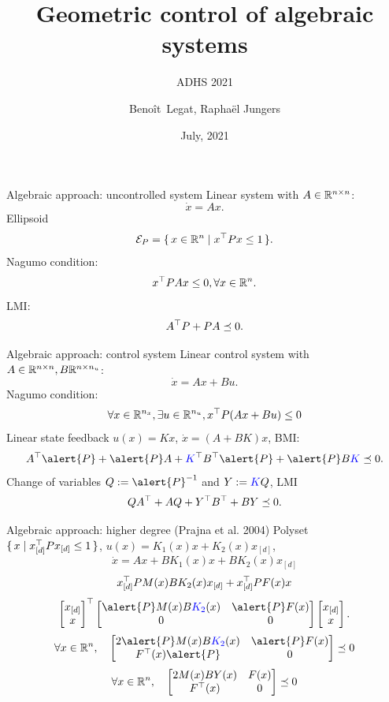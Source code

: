 \documentclass{beamer}
\title{Geometric control of algebraic systems}
\subtitle{ADHS 2021}
\date{July, 2021}
\author{Beno\^it~Legat, Rapha\"el Jungers}
\newcommand{\xd}{x_{[d]}}
\newcommand{\xdt}{x_{[d]}^\Tr}
\begin{document}
  \maketitle


\begin{frame}{Algebraic approach: uncontrolled system}
  Linear system with $A \in \mathbb{R}^{n \times n}$:
  \[\dot{x} = Ax.\]
  Ellipsoid
  $$\mathcal{E}_P = \{\, x \in \mathbb{R}^n \mid x^\top P x \leq 1 \,\}.$$
  Nagumo condition:
  $$x^\top PAx \leq 0, \forall x \in \mathbb{R}^n.$$
  LMI:
  $$A^\top P + PA \preceq 0.$$
\end{frame}

\begin{frame}{Algebraic approach: control system}
  Linear control system with $A \in \mathbb{R}^{n \times n}, B \mathbb{R}^{n \times n_u}$:
  \[\dot{x} = Ax + Bu.\]
  Nagumo condition:
  $$\forall x \in \mathbb{R}^{n_x}, \exists u \in \mathbb{R}^{n_u}, x^\top P(Ax + Bu) \leq 0$$
  Linear state feedback $u(x) = Kx$, $\dot{x} = (A + BK) x$, BMI:
  \[ A^\Tr \alert{P} + \alert{P}A + \textcolor{blue}{K}^\Tr B^\Tr \alert{P} + \alert{P}B\textcolor{blue}{K} \preceq 0. \]
  Change of variables $Q := \alert{P}^{-1}$ and $Y := \textcolor{blue}{K}Q$, LMI
  $$QA^\top + AQ + Y^\top B^\top + BY \preceq 0.$$
\end{frame}

\begin{frame}{Algebraic approach: higher degree (Prajna et al. 2004)}
  Polyset $\setbuild{x}{\xdt P \xd \le 1}$,
  $u(x) = K_1(x)x + K_2(x)\xd$,
  $$\dot{x} = Ax + BK_1(x)x + BK_2(x)\xd$$
  $$\xdt P M(x) B K_2(x) \xd + \xdt PF(x) x$$
$$
  \begin{bmatrix}
    \xd\\
    x
  \end{bmatrix}^\Tr
  \begin{bmatrix}
    \alert{P} M(x) B \textcolor{blue}{K_2}(x) & \alert{P}F(x)\\
    0 & 0
  \end{bmatrix}
  \begin{bmatrix}
    \xd\\
    x
  \end{bmatrix}.
  $$
$$
  \forall x \in \R^n, \quad
  \begin{bmatrix}
    2\alert{P} M(x) B \textcolor{blue}{K_2}(x) & \alert{P}F(x)\\
    F^\Tr(x)\alert{P} & 0
  \end{bmatrix} \preceq 0
  $$
$$
  \forall x \in \mathbb{R}^n, \quad
  \begin{bmatrix}
    2M(x) B Y(x) & F(x)\\
    F^\top(x) & 0
  \end{bmatrix} \preceq 0
$$
\end{frame}
\end{document}
